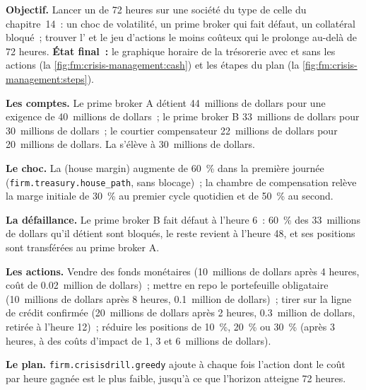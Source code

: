\begin{tutorial}
\textbf{Objectif.} Lancer un  de 72 heures sur une société du type de celle du chapitre~14~: un choc de volatilité, un prime broker qui fait défaut, un collatéral bloqué~; trouver
l' et le jeu d'actions le moins coûteux qui le prolonge au-delà de 72 heures. \textbf{État final~:} le graphique horaire de la trésorerie avec et sans les
actions (la \cref{fig:fm:crisis-management:cash}) et les étapes du plan (la \cref{fig:fm:crisis-management:steps}).
\begin{tutsteps}
\item \textbf{Les comptes.} Le prime broker A détient 44~millions de dollars pour une exigence de 40~millions de dollars~; le prime broker B 33~millions de dollars pour 30~millions de dollars~;
le courtier compensateur 22~millions de dollars pour 20~millions de dollars. La  s'élève à 30~millions de dollars.
\item \textbf{Le choc.} La  (house margin) augmente de 60~\% dans la première journée (\texttt{firm.treasury.house\_path}, sans blocage)~; la chambre de compensation relève
la marge initiale de 30~\% au premier cycle quotidien et de 50~\% au second.
\item \textbf{La défaillance.} Le prime broker B fait défaut à l'heure 6~: 60~\% des 33~millions de dollars qu'il détient sont bloqués, le reste revient à l'heure 48, et ses
positions sont transférées au prime broker A.
\item \textbf{Les actions.} Vendre des fonds monétaires (10~millions de dollars après 4 heures, coût de 0.02~million de dollars)~; mettre en repo le portefeuille obligataire (10~millions de dollars après 8
heures, 0.1~million de dollars)~; tirer sur la ligne de crédit confirmée (20~millions de dollars après 2 heures, 0.3~million de dollars, retirée à l'heure 12)~; réduire les positions de 10~\%, 20~\% ou 30~\%
(après 3 heures, à des coûts d'impact de 1, 3 et 6~millions de dollars).
\item \textbf{Le plan.} \texttt{firm.crisisdrill.greedy} ajoute à chaque fois l'action dont le coût par heure gagnée est le plus faible, jusqu'à ce que l'horizon atteigne 72 heures.
\end{tutsteps}
\end{tutorial}

